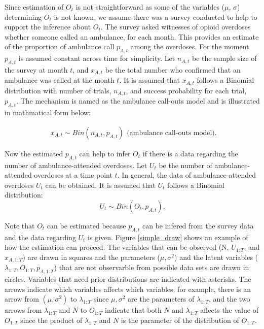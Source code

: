 \documentclass[12pt]{article}
\begin{document}
{ 
Since estimation of $O_t$ is not straightforward as some of the variables ($\mu$, $\sigma$) determining $O_t$ is not known, we assume there was a survey conducted to help to support the inference about  $O_t$. The survey asked witnesses of opioid overdoses whether someone called an ambulance, for each month. This provides an estimate of the proportion of ambulance call $p_{A,t}$ among the overdoses. For the moment $p_{A,t}$ is assumed constant across time for simplicity. Let $n_{A,t}$ be the sample size of the survey at month $t$, and $x_{A,t}$ be the total number who confirmed that an ambulance was called at the month $t$. It is assumed that $x_{A,t}$ follows a Binomial distribution with number of trials, $n_{A,t}$, and  success probability for each trial, $p_{A,t}$. The mechanism is named as the ambulance call-outs model and is illustrated in mathmatical form below:

\begin{equation}
\label{ambulance}
\left.\begin{aligned}
x_{A,t} \sim Bin(n_{A,t},p_{A,t})\end{aligned}\right.
\text{(ambulance call-outs model).}
\end{equation}

Now the estimated $p_{A,t}$ can help to infer $O_t$ if there is a data regarding the number of  ambulance-attended overdoses. Let \(U_t\) be the number of ambulance-attended overdoses at a time point $t$. In general, the data of ambulance-attended overdoses \(U_t\) can be obtained. It is assumed that  \(U_t\) follows a Binomial distribution: 
\begin{equation}
\label{over_amb}
\left.
U_t \sim Bin(O_t, p_{A,t}).
\right.
\end{equation}

Note that $O_t$ can be estimated because $p_{A,t}$ can be infered from the survey data and the data regarding $U_t$ is given. Figure \ref{simple_draw} shows an example of how the estimation can proceed. The variables that can be observed (N, $U_{1:T}$, and $x_{A,1:T}$) are drawn in squares and the parameters ($\mu, \sigma^2$) and the latent variables ($\lambda_{1:T}, O_{1:T}, p_{A,1:T} $) that are not observarble from possible data sets are drawn in circles. Variables that need prior distributions are indicated with asterisks. The arrows indicate which variables affects which variables; for example, there is an arrow from $(\mu, \sigma^2)$ to $\lambda_{1:T}$ since $\mu, \sigma^2$ are the parameters of $\lambda_{1:T}$, and the two arrows from  $\lambda_{1:T}$ and $N$ to $O_{1:T}$ indicate that both $N$ and $\lambda_{1:T}$ affects the value of $O_{1:T}$ since the product of $\lambda_{1:T}$ and $N$ is the parameter of the distribution of $O_{1:T}$.

}
\end{document}
